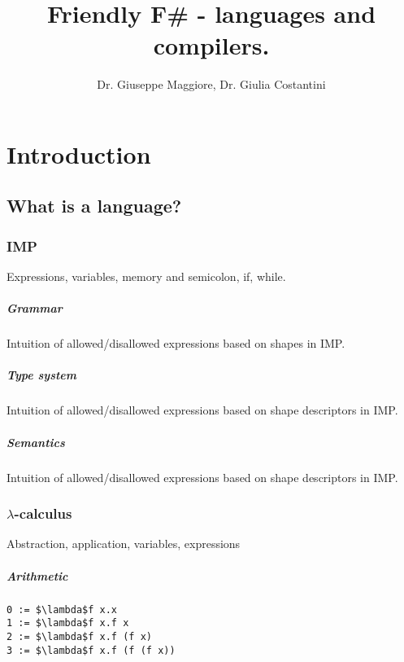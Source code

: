 \documentclass[12pt,b5paper]{book}
\title{Friendly F\# - languages and compilers.}
\author{Dr. Giuseppe Maggiore, Dr. Giulia Costantini}
\theoremstyle{definition}
\begin{document}
\maketitle
\tableofcontents

\chapter{Introduction}
\label{sec:introduction}

\section{What is a language?}
\subsection{IMP}
Expressions, variables, memory and semicolon, if, while.

\paragraph{Grammar}
Intuition of allowed/disallowed expressions based on shapes in IMP.

\paragraph{Type system}
Intuition of allowed/disallowed expressions based on shape descriptors in IMP.

\paragraph{Semantics}
Intuition of allowed/disallowed expressions based on shape descriptors in IMP.


\subsection{$\lambda$-calculus}
Abstraction, application, variables, expressions \\

\paragraph{Arithmetic}

\begin{lstlisting}
0 := $\lambda$f x.x
1 := $\lambda$f x.f x
2 := $\lambda$f x.f (f x)
3 := $\lambda$f x.f (f (f x))
\end{lstlisting}
\end{document}
